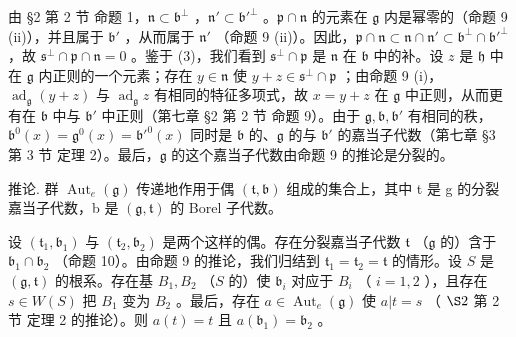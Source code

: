 由 §2 第 2 节 命题 1，\(\mathfrak{n} \subset \mathfrak{b}^{\perp}\) ，\(\mathfrak{n}' \subset \mathfrak{b}'^{\perp}\) 。\(\mathfrak{p} \cap \mathfrak{n}\) 的元素在 \(\mathfrak{g}\) 内是幂零的（命题 9 (ii)），并且属于 \(\mathfrak{b}'\) ，从而属于 \(\mathfrak{n}'\) （命题 9 (ii)）。因此，\(\mathfrak{p} \cap \mathfrak{n} \subset \mathfrak{n} \cap \mathfrak{n}' \subset \mathfrak{b}^{\perp} \cap \mathfrak{b}'^{\perp}\) ，故 \(\mathfrak{s}^{\perp} \cap \mathfrak{p} \cap \mathfrak{n} = 0\) 。鉴于 (3)，我们看到 \(\mathfrak{s}^{\perp} \cap \mathfrak{p}\) 是 \(\mathfrak{n}\) 在 \(\mathfrak{b}\) 中的补。设 \(z\) 是 \(\mathfrak{h}\) 中在 \(\mathfrak{g}\) 内正则的一个元素；存在 \(y \in \mathfrak{n}\) 使 \(y + z \in \mathfrak{s}^{\perp} \cap \mathfrak{p}\) ；由命题 9 (i)，\(\operatorname{ad}_{\mathfrak{g}}(y + z)\) 与 \(\operatorname{ad}_{\mathfrak{g}}z\) 有相同的特征多项式，故 \(x = y + z\) 在 \(\mathfrak{g}\) 中正则，从而更有在 \(\mathfrak{b}\) 中与 \(\mathfrak{b}'\) 中正则（第七章 §2 第 2 节 命题 9）。由于 \(\mathfrak{g}, \mathfrak{b}, \mathfrak{b}'\) 有相同的秩，\(\mathfrak{b}^{0}(x) = \mathfrak{g}^{0}(x) = \mathfrak{b}'^{0}(x)\) 同时是 \(\mathfrak{b}\) 的、\(\mathfrak{g}\) 的与 \(\mathfrak{b}'\) 的嘉当子代数（第七章 §3 第 3 节 定理 2）。最后，\(\mathfrak{g}\) 的这个嘉当子代数由命题 9 的推论是分裂的。

推论. 群 \(\operatorname{Aut}_{e}(\mathfrak{g})\) 传递地作用于偶 \((\mathfrak{t},\mathfrak{b})\) 组成的集合上，其中 t 是 g 的分裂嘉当子代数，b 是 \((\mathfrak{g},\mathfrak{t})\) 的 Borel 子代数。

设 \((\mathfrak{t}_1, \mathfrak{b}_1)\) 与 \((\mathfrak{t}_2, \mathfrak{b}_2)\) 是两个这样的偶。存在分裂嘉当子代数 \(\mathfrak{t}\) （\(\mathfrak{g}\) 的）含于 \(\mathfrak{b}_1 \cap \mathfrak{b}_2\) （命题 10）。由命题 9 的推论，我们归结到 \(\mathfrak{t}_1 = \mathfrak{t}_2 = \mathfrak{t}\) 的情形。设 \(S\) 是 \((\mathfrak{g}, \mathfrak{t})\) 的根系。存在基 \(B_1, B_2\) （\(S\) 的）使 \(\mathfrak{b}_i\) 对应于 \(B_i\) （ \(i = 1, 2\) ），且存在 \(s \in W(S)\) 把 \(B_1\) 变为 \(B_2\) 。最后，存在 \(a \in \operatorname{Aut}_e(\mathfrak{g})\) 使 \(a|t = s\) （ \(\S 2\) 第 2 节 定理 2 的推论）。则 \(a(t) = t\) 且 \(a(\mathfrak{b}_1) = \mathfrak{b}_2\) 。

